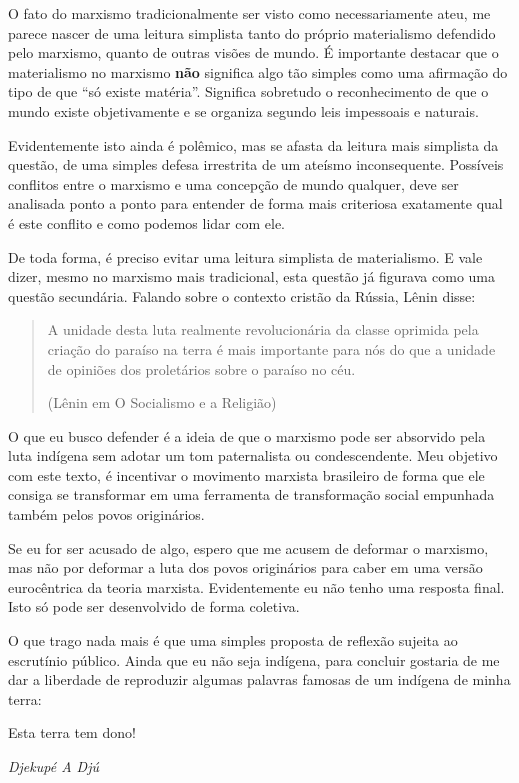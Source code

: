 O fato do marxismo tradicionalmente ser visto como necessariamente ateu, me parece nascer de uma leitura simplista tanto do próprio materialismo defendido pelo marxismo, quanto de outras visões de mundo. É importante destacar que o materialismo no marxismo \textbf{não} significa algo tão simples como uma afirmação do tipo de que “só existe matéria”. Significa sobretudo o reconhecimento de que o mundo existe objetivamente e se organiza segundo leis impessoais e naturais. 

Evidentemente isto ainda é polêmico, mas se afasta da leitura mais simplista da questão, de uma simples defesa irrestrita de um ateísmo inconsequente. Possíveis conflitos entre o marxismo e uma concepção de mundo qualquer, deve ser analisada ponto a ponto para entender de forma mais criteriosa exatamente qual é este conflito e como podemos lidar com ele.

De toda forma, é preciso evitar uma leitura simplista de materialismo. E vale dizer, mesmo no marxismo mais tradicional, esta questão já figurava como uma questão secundária. Falando sobre o contexto cristão da Rússia, Lênin disse:

\begin{quote}
A unidade desta luta realmente revolucionária da classe oprimida pela criação do paraíso na terra é mais importante para nós do que a unidade de opiniões dos proletários sobre o paraíso no céu.

(Lênin em O Socialismo e a Religião)
\end{quote}

O que eu busco defender é a ideia de que o marxismo pode ser absorvido pela luta indígena sem adotar um tom paternalista ou condescendente. Meu objetivo com este texto, é incentivar o movimento marxista brasileiro de forma que ele consiga se transformar em uma ferramenta de transformação social empunhada também pelos povos originários.

Se eu for ser acusado de algo, espero que me acusem de deformar o marxismo, mas não por deformar a luta dos povos originários para caber em uma versão eurocêntrica da teoria marxista. Evidentemente eu não tenho uma resposta final. Isto só pode ser desenvolvido de forma coletiva.

O que trago nada mais é que uma simples proposta de reflexão sujeita ao escrutínio público. Ainda que eu não seja indígena, para concluir gostaria de me dar a liberdade de reproduzir algumas palavras famosas de um indígena de minha terra:

Esta terra tem dono!

\textit{Djekupé A Djú}

